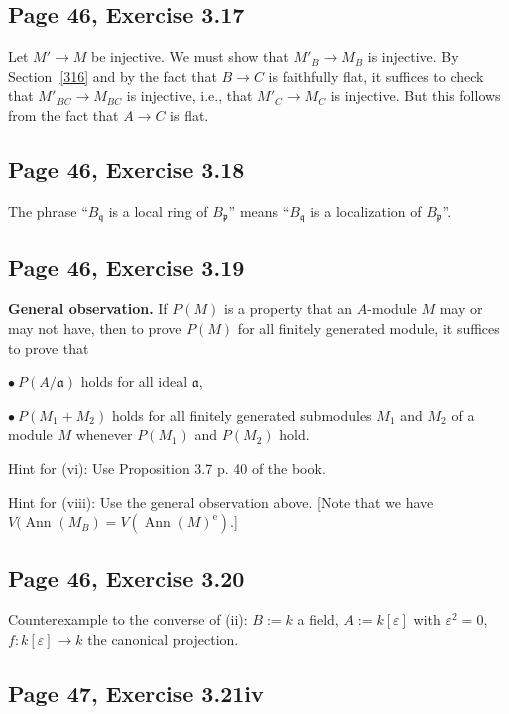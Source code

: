 \documentclass[parskip=half,fontsize=12pt]{scrartcl}%
\newcommand{\oo}{\operatorname}\newcommand{\ooo}{\operatorname*}
\newcommand{\mf}{\mathfrak}
\newcommand{\aaa}{\mf a}
\newcommand{\ppp}{\mf p}
\newcommand{\qqq}{\mf q}
\newcommand{\Ann}{\oo{Ann}}
\newcommand{\bu}{\bullet}
\begin{document}
\subsection{Page 46, Exercise 3.17}%

Let $M'\to M$ be injective. We must show that $M'_B\to M_B$ is injective.  By Section~\ref{316} and by the fact that $B\to C$ is faithfully flat, it suffices to check that $M'_{BC}\to M_{BC}$ is injective, i.e., that $M'_C\to M_C$ is injective. But this follows from the fact that $A\to C$ is flat.

\subsection{Page 46, Exercise 3.18}%

The phrase ``$B_\qqq$ is a local ring of $B_\ppp$'' means ``$B_\qqq$ is a localization of $B_\ppp$''.

\subsection{Page 46, Exercise 3.19}%

\textbf{General observation.} If $P(M)$ is a property that an $A$-module $M$ may or may not have, then to prove $P(M)$ for all finitely generated module, it suffices to prove that 

$\bu\ P(A/\aaa)$ holds for all ideal $\aaa$,

$\bu\ P(M_1+M_2)$ holds for all finitely generated submodules $M_1$ and $M_2$ of a module $M$ whenever $P(M_1)$ and $P(M_2)$ hold.

Hint for (vi): Use Proposition 3.7 p. 40 of the book.

Hint for (viii): Use the general observation above. [Note that we have $V(\Ann(M_B)=V(\Ann(M)^{\oo e})$.]

\subsection{Page 46, Exercise 3.20}%

Counterexample to the converse of (ii): $B:=k$ a field, $A:=k[\varepsilon]$ with $\varepsilon^2=0$, $f:k[\varepsilon]\to k$ the canonical projection. 

\subsection{Page 47, Exercise 3.21iv}\label{321iv}%
\end{document}
